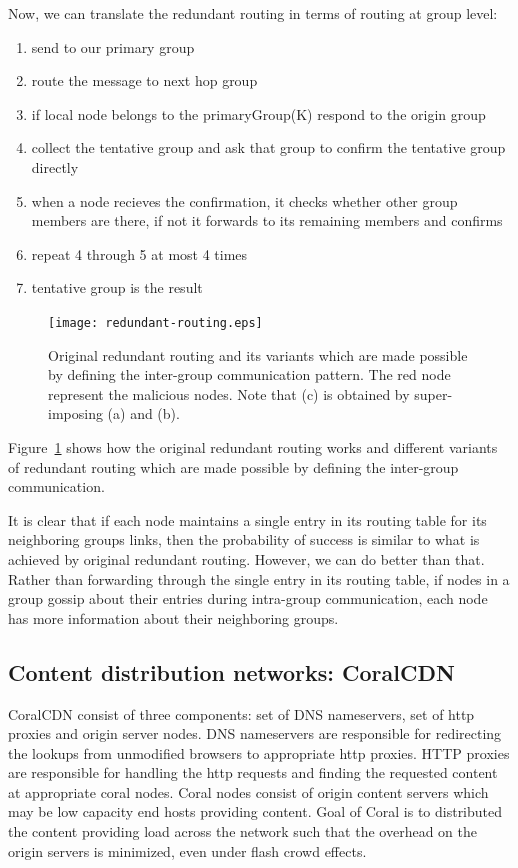 Now, we can translate the redundant routing in terms of routing at group level: 
\begin{enumerate} 
\item{} send to our primary group 
\item{} route the message to next hop group 
\item{} if local node belongs to the primaryGroup(K) respond to the origin group 
\item{} collect the tentative group and ask that group to confirm the tentative group directly 
\item{} when a node recieves the confirmation, it checks whether other group members are there, if not it forwards to its remaining members and confirms 
\item{} repeat 4 through 5 at most 4 times 
\item{} tentative group is the result 
\end{enumerate} 
 
\begin{figure} 
\begin{center} 
\texttt{[image: redundant-routing.eps]} 
\end{center} 
\caption{Original redundant routing and its variants which are made possible by defining the inter-group communication pattern. The red node represent the malicious nodes. Note that (c) is obtained by super-imposing (a) and (b).} 
\label{redundant-routing} 
\end{figure} 
 
Figure~\ref{redundant-routing} shows how the original redundant routing works and different variants of redundant routing which are made possible by defining the inter-group communication. 
 
 
It is clear that if each node maintains a single entry in its routing table for its neighboring groups links, then the probability of success is similar to what is achieved by original redundant routing. However, we can do better than that. Rather than forwarding through the single entry in its routing table, if nodes in a group gossip about their entries during intra-group communication, each node has more information about their neighboring groups.  

 
\subsection{Content distribution networks: CoralCDN} 
 CoralCDN consist of three components: set of DNS nameservers, set of http proxies and origin server nodes. DNS nameservers are responsible for redirecting the lookups from unmodified browsers to appropriate http proxies. HTTP proxies are responsible for handling the http requests and finding the requested content at appropriate coral nodes. Coral nodes consist of origin content servers which may be low capacity end hosts providing content. Goal of Coral is to distributed the content providing load across the network such that the overhead on the origin servers is minimized, even under flash crowd effects.

